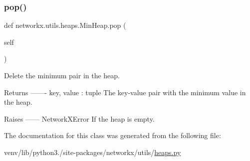 \subsubsection{\texorpdfstring{pop()}{pop()}}
{\footnotesize\ttfamily def networkx.\+utils.\+heaps.\+Min\+Heap.\+pop (\begin{DoxyParamCaption}\item[{}]{self }\end{DoxyParamCaption})}

\begin{DoxyVerb}Delete the minimum pair in the heap.

Returns
-------
key, value : tuple
    The key-value pair with the minimum value in the heap.

Raises
------
NetworkXError
    If the heap is empty.
\end{DoxyVerb}
 

The documentation for this class was generated from the following file\+:\begin{DoxyCompactItemize}
\item 
venv/lib/python3./site-\/packages/networkx/utils/\hyperlink{heaps_8py}{heaps.\+py}\end{DoxyCompactItemize}
